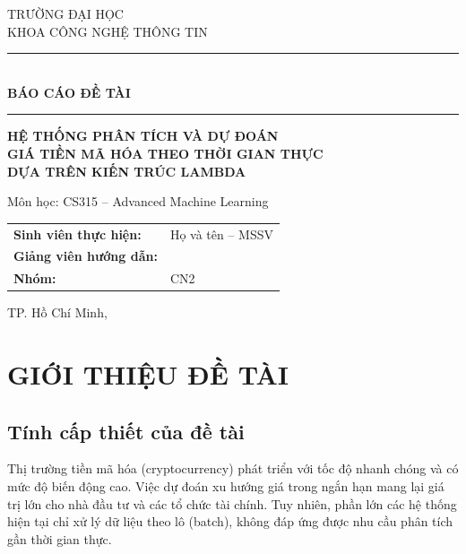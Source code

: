 \documentclass[12pt, a4paper]{report}
\begin{document}
\begin{titlepage}
  \centering
  \vspace*{1cm}

  {\large TRƯỜNG ĐẠI HỌC\\[0.3em]
  KHOA CÔNG NGHỆ THÔNG TIN}

  \vspace{1.5cm}
  \rule{\linewidth}{0.5pt}\\[0.4cm]
  {\LARGE \bfseries BÁO CÁO ĐỀ TÀI}\\[0.4cm]
  \rule{\linewidth}{0.5pt}

  \vspace{1cm}
  {\Large \bfseries HỆ THỐNG PHÂN TÍCH VÀ DỰ ĐOÁN\\[0.3em]
  GIÁ TIỀN MÃ HÓA THEO THỜI GIAN THỰC\\[0.3em]
  DỰA TRÊN KIẾN TRÚC LAMBDA}

  \vspace{1cm}
  {\normalsize Môn học: CS315 -- Advanced Machine Learning}

  \vspace{2cm}
  \begin{tabular}{ll}
    \textbf{Sinh viên thực hiện:} & Họ và tên -- MSSV \\[0.3em]
    \textbf{Giảng viên hướng dẫn:} & \\[0.3em]
    \textbf{Nhóm:} & CN2 \\
  \end{tabular}

  \vfill
  {\normalsize TP. Hồ Chí Minh, \the\year}
\end{titlepage}

\tableofcontents
\listoffigures
\listoftables
\newpage

\chapter{GIỚI THIỆU ĐỀ TÀI}

\section{Tính cấp thiết của đề tài}

Thị trường tiền mã hóa (cryptocurrency) phát triển với tốc độ nhanh chóng và có mức độ biến động cao. Việc dự đoán xu hướng giá trong ngắn hạn mang lại giá trị lớn cho nhà đầu tư và các tổ chức tài chính. Tuy nhiên, phần lớn các hệ thống hiện tại chỉ xử lý dữ liệu theo lô (batch), không đáp ứng được nhu cầu phân tích gần thời gian thực.
\end{document}
